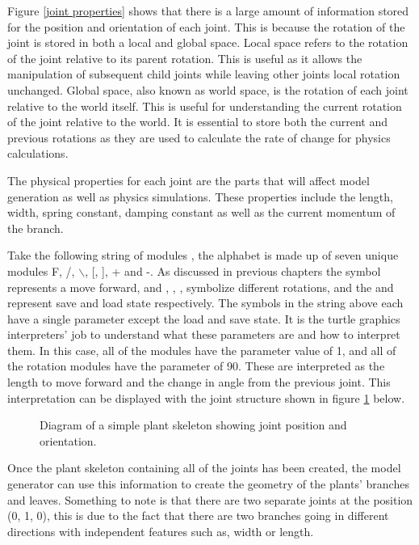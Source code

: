 \noindent
Figure \ref{joint properties} shows that there is a large amount of information stored for the position and orientation of each joint. This is because the rotation of the joint is stored in both a local and global space. Local space refers to the rotation of the joint relative to its parent rotation. This is useful as it allows the manipulation of subsequent child joints while leaving other joints local rotation unchanged. Global space, also known as world space, is the rotation of each joint relative to the world itself. This is useful for understanding the current rotation of the joint relative to the world. It is essential to store both the current and previous rotations as they are used to calculate the rate of change for physics calculations.

The physical properties for each joint are the parts that will affect model generation as well as physics simulations. These properties include the length, width, spring constant, damping constant as well as the current momentum of the branch. 

Take the following string of modules , the alphabet is made up of seven unique modules F, /, $\backslash$, [, ], + and -. As discussed in previous chapters the  symbol represents a move forward, and \say{+}, \say{-}, \say{/}, \say{$\backslash$} symbolize different rotations, and the \say{[} and \say{]} represent save and load state respectively. The symbols in the string above each have a single parameter except the load and save state. It is the turtle graphics interpreters' job to understand what these parameters are and how to interpret them. In this case, all of the  modules have the parameter value of 1, and all of the rotation modules have the parameter of 90. These are interpreted as the length to move forward and the change in angle from the previous joint. This interpretation can be displayed with the joint structure shown in figure \ref{skeleton diagram} below.

\begin{figure}[htbp]
	{\centering
		\vspace{7px}
		\setlength{\fboxrule}{1pt}
		\caption{Diagram of a simple plant skeleton showing joint position and orientation.} \label{skeleton diagram}
	}
\end{figure}
\FloatBarrier

\noindent
Once the plant skeleton containing all of the joints has been created, the model generator can use this information to create the geometry of the plants' branches and leaves. Something to note is that there are two separate joints at the position (0, 1, 0), this is due to the fact that there are two branches going in different directions with independent features such as, width or length. 

